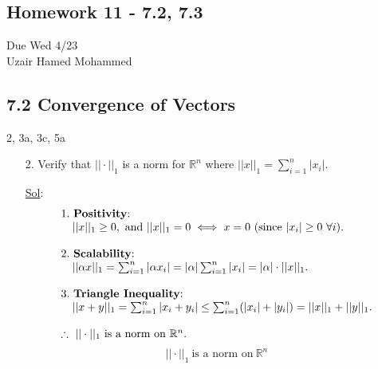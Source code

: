 \begin{center}
  \section*{Homework 11 - 7.2, 7.3}
  Due Wed 4/23 \\
  Uzair Hamed Mohammed
\end{center}

\subsection*{7.2 Convergence of Vectors}

2, 3a, 3c, 5a

\begin{enumerate}
  \item[2.] Verify that \(|| \cdot ||_1\) is a norm for
    \(\mathbb{R}^n\) where \(|| x ||_1 = \sum_{i = 1}^{n} |x_i|\).

    \underline{Sol}:\\
    \[
      \begin{array}{l}
        1.\ \text{\textbf{Positivity}:} \\
        \quad ||x||_1 \geq 0,\ \text{and}\ ||x||_1 = 0 \iff x = 0
        \ \text{(since}\ |x_i| \geq 0\ \forall i). \\
        \\
        2.\ \text{\textbf{Scalability}:} \\
        \quad ||\alpha x||_1 = \sum_{i=1}^n |\alpha x_i| =
        |\alpha|\sum_{i=1}^n |x_i| = |\alpha| \cdot ||x||_1. \\
        \\
        3.\ \text{\textbf{Triangle Inequality}:} \\
        \quad ||x + y||_1 = \sum_{i=1}^n |x_i + y_i| \leq
        \sum_{i=1}^n (|x_i| + |y_i|) = ||x||_1 + ||y||_1. \\
        \\
        \therefore\ || \cdot ||_1\ \text{is a norm on}\ \mathbb{R}^n.
      \end{array}
    \]
    \[
      \boxed{|| \cdot ||_1\ \text{is a norm on}\ \mathbb{R}^n}
    \]


\end{enumerate}
